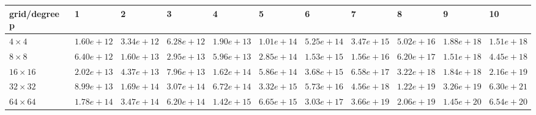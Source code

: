 \begin{tabular}{lllllllllll}
\hline
 grid/degree p   & 1          & 2          & 3          & 4          & 5          & 6          & 7          & 8          & 9          & 10         \\
\hline
 $4 \times 4$    & $1.60e+12$ & $3.34e+12$ & $6.28e+12$ & $1.90e+13$ & $1.01e+14$ & $5.25e+14$ & $3.47e+15$ & $5.02e+16$ & $1.88e+18$ & $1.51e+18$ \\
 $8 \times 8$    & $6.40e+12$ & $1.60e+13$ & $2.95e+13$ & $5.96e+13$ & $2.85e+14$ & $1.53e+15$ & $1.56e+16$ & $6.20e+17$ & $1.51e+18$ & $4.45e+18$ \\
 $16 \times 16$  & $2.02e+13$ & $4.37e+13$ & $7.96e+13$ & $1.62e+14$ & $5.86e+14$ & $3.68e+15$ & $6.58e+17$ & $3.22e+18$ & $1.84e+18$ & $2.16e+19$ \\
 $32 \times 32$  & $8.99e+13$ & $1.69e+14$ & $3.07e+14$ & $6.72e+14$ & $3.32e+15$ & $5.73e+16$ & $4.56e+18$ & $1.22e+19$ & $3.26e+19$ & $6.30e+21$ \\
 $64 \times 64$  & $1.78e+14$ & $3.47e+14$ & $6.20e+14$ & $1.42e+15$ & $6.65e+15$ & $3.03e+17$ & $3.66e+19$ & $2.06e+19$ & $1.45e+20$ & $6.54e+20$ \\
\hline
\end{tabular}